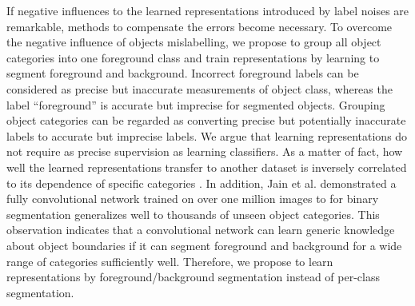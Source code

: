 If negative influences to the learned representations introduced by label noises are remarkable, methods to compensate the errors become necessary.
To overcome the negative influence of objects mislabelling, we propose to group all object categories into one foreground class and train representations by learning to segment foreground and background.
Incorrect foreground labels can be considered as precise but inaccurate measurements of object class, whereas the label ``foreground'' is accurate but imprecise for segmented objects.
Grouping object categories can be regarded as converting precise but potentially inaccurate labels to accurate but imprecise labels.
We argue that learning representations do not require as precise supervision as learning classifiers.
As a matter of fact, how well the learned representations transfer to another dataset is inversely correlated to its dependence of specific categories \cite{yosinski2014transferable}.
In addition, Jain et al. \cite{jain2017pixel} demonstrated a fully convolutional network trained on over one million images to for binary segmentation generalizes well to thousands of unseen object categories.
This observation indicates that a convolutional network can learn generic knowledge about object boundaries if it can segment foreground and background for a wide range of categories sufficiently well.
Therefore, we propose to learn representations by foreground/background segmentation instead of per-class segmentation.





